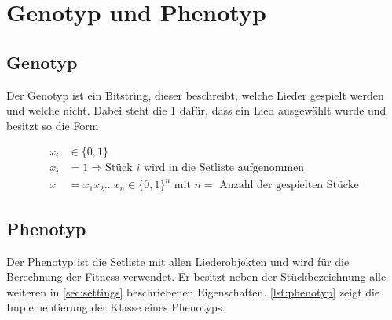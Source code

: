 \section{Genotyp und Phenotyp}\label{sec:genotypPhenotyp}
\subsection{Genotyp}
Der Genotyp ist ein Bitstring, dieser beschreibt, welche Lieder gespielt werden und welche nicht.
Dabei steht die 1 dafür, dass ein Lied ausgewählt wurde und besitzt so die Form

\begin{equation}
    \label{eqn:genotyp}
    \begin{split}
        x_i &\in \{ 0,1 \} \\
        x_i &= 1 \Rightarrow \text{Stück $i$ wird in die Setliste aufgenommen} \\
        x   &= x_1x_2...x_n \in \{0,1\}^n\text{ mit $n = $ Anzahl der gespielten Stücke}
    \end{split}
\end{equation}

\subsection{Phenotyp}
Der Phenotyp ist die Setliste mit allen Liederobjekten und wird für die
Berechnung der Fitness verwendet.
Er besitzt neben der Stückbezeichnung alle weiteren in \autoref{sec:settings}
beschriebenen Eigenschaften. \autoref{lst:phenotyp} zeigt die Implementierung der Klasse
eines Phenotyps.


